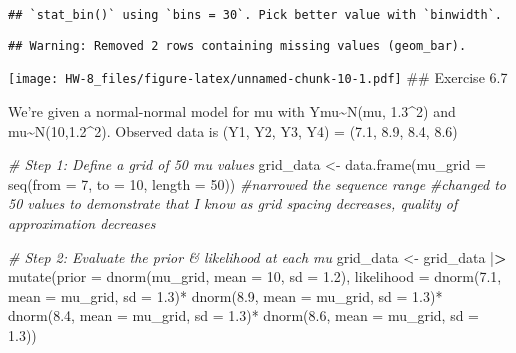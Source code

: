 \documentclass[
]{article}
\newenvironment{Shaded}{\begin{snugshade}}{\end{snugshade}}
\newcommand{\AttributeTok}[1]{\textcolor[rgb]{0.77,0.63,0.00}{#1}}
\newcommand{\CommentTok}[1]{\textcolor[rgb]{0.56,0.35,0.01}{\textit{#1}}}
\newcommand{\DecValTok}[1]{\textcolor[rgb]{0.00,0.00,0.81}{#1}}
\newcommand{\ErrorTok}[1]{\textcolor[rgb]{0.64,0.00,0.00}{\textbf{#1}}}
\newcommand{\FloatTok}[1]{\textcolor[rgb]{0.00,0.00,0.81}{#1}}
\newcommand{\FunctionTok}[1]{\textcolor[rgb]{0.00,0.00,0.00}{#1}}
\newcommand{\NormalTok}[1]{#1}
\newcommand{\OtherTok}[1]{\textcolor[rgb]{0.56,0.35,0.01}{#1}}
\newcommand{\SpecialCharTok}[1]{\textcolor[rgb]{0.00,0.00,0.00}{#1}}
\begin{document}
\begin{verbatim}
## `stat_bin()` using `bins = 30`. Pick better value with `binwidth`.
\end{verbatim}

\begin{verbatim}
## Warning: Removed 2 rows containing missing values (geom_bar).
\end{verbatim}

\texttt{[image: HW-8\_files/figure-latex/unnamed-chunk-10-1.pdf]} \#\#
Exercise 6.7

We're given a normal-normal model for mu with
Y\textbar mu\textasciitilde N(mu, 1.3\^{}2) and
mu\textasciitilde N(10,1.2\^{}2). Observed data is (Y1, Y2, Y3, Y4) =
(7.1, 8.9, 8.4, 8.6)

\begin{Shaded}
\begin{Highlighting}[]
\CommentTok{\# Step 1: Define a grid of 50 mu values}
\NormalTok{grid\_data  }\OtherTok{\textless{}{-}} \FunctionTok{data.frame}\NormalTok{(}\AttributeTok{mu\_grid =} \FunctionTok{seq}\NormalTok{(}\AttributeTok{from =} \DecValTok{7}\NormalTok{, }\AttributeTok{to =} \DecValTok{10}\NormalTok{, }\AttributeTok{length =} \DecValTok{50}\NormalTok{)) }\CommentTok{\#narrowed the sequence range }
\CommentTok{\#changed to 50 values to demonstrate that I know as grid spacing decreases, quality of approximation decreases }

\CommentTok{\# Step 2: Evaluate the prior \& likelihood at each mu}
\NormalTok{grid\_data }\OtherTok{\textless{}{-}}\NormalTok{ grid\_data }\SpecialCharTok{|}\ErrorTok{\textgreater{}} 
  \FunctionTok{mutate}\NormalTok{(}\AttributeTok{prior =} \FunctionTok{dnorm}\NormalTok{(mu\_grid, }\AttributeTok{mean =} \DecValTok{10}\NormalTok{, }\AttributeTok{sd =} \FloatTok{1.2}\NormalTok{), }
         \AttributeTok{likelihood =} \FunctionTok{dnorm}\NormalTok{(}\FloatTok{7.1}\NormalTok{, }\AttributeTok{mean =}\NormalTok{ mu\_grid, }\AttributeTok{sd =} \FloatTok{1.3}\NormalTok{)}\SpecialCharTok{*}
           \FunctionTok{dnorm}\NormalTok{(}\FloatTok{8.9}\NormalTok{, }\AttributeTok{mean =}\NormalTok{ mu\_grid, }\AttributeTok{sd =} \FloatTok{1.3}\NormalTok{)}\SpecialCharTok{*} 
           \FunctionTok{dnorm}\NormalTok{(}\FloatTok{8.4}\NormalTok{, }\AttributeTok{mean =}\NormalTok{ mu\_grid, }\AttributeTok{sd =} \FloatTok{1.3}\NormalTok{)}\SpecialCharTok{*} 
           \FunctionTok{dnorm}\NormalTok{(}\FloatTok{8.6}\NormalTok{, }\AttributeTok{mean =}\NormalTok{ mu\_grid, }\AttributeTok{sd =} \FloatTok{1.3}\NormalTok{))}



\end{Highlighting}
\end{Shaded}
\end{document}
